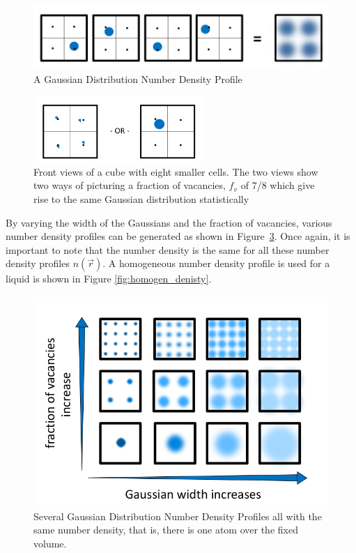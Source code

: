 \documentclass[double,12pt]{beavtex}
\begin{document}
 \begin{figure}[h!]
    \centering
    \includegraphics[height=2.5cm]{Ensemble_Smallcells.png}
    \caption{A Gaussian Distribution Number Density Profile}
    \label{fig:Ensemble_Smallcells}
  \end{figure} 

\begin{figure}[h!]
    \centering
    \includegraphics[height=2.5cm]{SameStatPic.png}
    \caption{Front views of a cube with eight smaller cells. The two views 
    show two ways of picturing a fraction of vacancies, $f_v$ of 7/8 which 
    give rise to the same Gaussian distribution statistically}
    \label{fig:SameStatPic}
  \end{figure} 

By varying the width of the Gaussians and the fraction of vacancies, various
number density profiles can be generated as shown in Figure~\ref{fig:Ensemble_vary}.
Once again, it is important to note that the number density is the same 
for all these number density profiles $n(\vec{r})$. 
A homogeneous number density profile is used for a liquid is shown in Figure \ref{fig:homogen_denisty}.

\begin{figure}[h!]
    \centering
    \includegraphics[height=8cm]{VaryWidthandVacancies.png}
    \caption{Several Gaussian Distribution Number Density Profiles all 
    with the same number density, that is, there is one atom over the fixed volume.}
    \label{fig:Ensemble_vary}
  \end{figure}  
\end{document}

